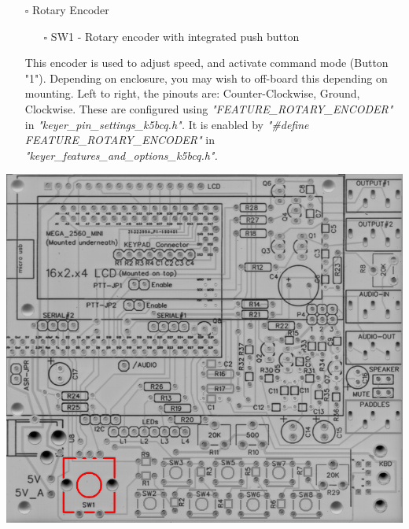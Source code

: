 \documentclass[11pt]{article}
\begin{document}
\newpage
\begin{itemize}
\item[{$\square$}] Rotary Encoder
\begin{itemize}
\item[{$\square$}] SW1 - Rotary encoder with integrated push button
\end{itemize}

This encoder is used to adjust speed, and activate command mode (Button "1").  Depending on enclosure, you may wish to off-board this depending on mounting.  Left to right, the pinouts are:  Counter-Clockwise, Ground, Clockwise.  These are configured using \emph{"FEATURE\_ROTARY\_ENCODER"} in \emph{"keyer\_pin\_settings\_k5bcq.h".}  It is enabled by \emph{"\#define FEATURE\_ROTARY\_ENCODER"} in \emph{"keyer\_features\_and\_options\_k5bcq.h".}
\end{itemize}
\begin{center}
\includegraphics[width=.9\linewidth]{../png/3.2/pcb-top-rotary-encoder.png}
\end{center}
\end{document}
